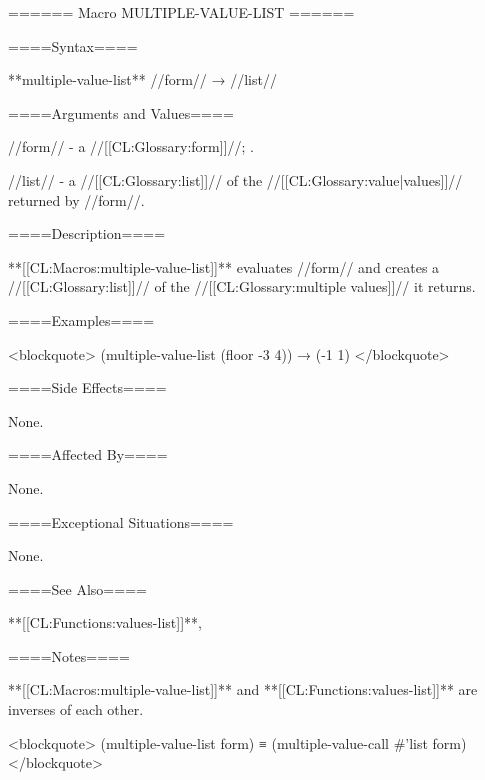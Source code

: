 ====== Macro MULTIPLE-VALUE-LIST ======

====Syntax====

**multiple-value-list** //form// → //list//

====Arguments and Values====

//form// - a //[[CL:Glossary:form]]//; \evalspecial.

//list// - a //[[CL:Glossary:list]]// of the //[[CL:Glossary:value|values]]// returned by //form//.

====Description====

**[[CL:Macros:multiple-value-list]]** evaluates //form// and creates a //[[CL:Glossary:list]]// of the //[[CL:Glossary:multiple values]]// it returns.

====Examples====

<blockquote> (multiple-value-list (floor -3 4)) → (-1 1) </blockquote>

====Side Effects====

None.

====Affected By====

None.

====Exceptional Situations====

None.

====See Also====

**[[CL:Functions:values-list]]**, 

====Notes====

**[[CL:Macros:multiple-value-list]]** and **[[CL:Functions:values-list]]** are inverses of each other.

<blockquote> (multiple-value-list form) ≡ (multiple-value-call #'list form) </blockquote>

